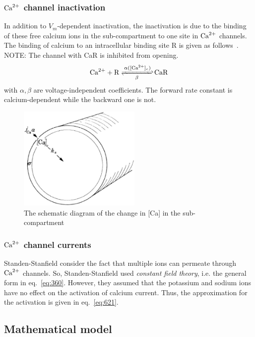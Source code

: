 \subsubsection{${\text{Ca}^{2+}}$ channel inactivation}
\label{sec:inactivation-1}

In addition to $V_m$-dependent inactivation, the inactivation is due
to the binding of these free calcium ions in the sub-compartment to one site in
${\text{Ca}^{2+}}$ channels. The binding of calcium to an intracellular binding site R is
given as follows~\citep{ashcroft1982cis}. NOTE: The channel with CaR is inhibited from
opening.
\begin{equation}
  \label{eq:382}
  \Ca +  \ce{R <=>[\alpha(\text{$[\Ca]_c$})][\beta] CaR}
\end{equation}
with $\alpha, \beta$ are voltage-independent coefficients. The forward rate
constant is calcium-dependent while the backward one is not. 

\begin{figure}[hbt]
  \centerline{\includegraphics[height=5cm,
    angle=0]{./images/SS_sigma.eps}}
  \caption{The schematic diagram of the change in [Ca] in the
    sub-compartment}
  \label{fig:sub-compartment}
\end{figure}


\subsubsection{${\text{Ca}^{2+}}$ channel currents}

Standen-Stanfield consider the fact that multiple ions can permeate through
${\text{Ca}^{2+}}$ channels. So, Standen-Stanfield used {\it constant field theory}, i.e. the
general form in eq.~\eqref{eq:360}. However, they assumed that the potassium and
sodium ions have no effect on the activation of calcium current. Thus,
the approximation for the activation is given in eq.~\eqref{eq:621}.

\subsection{Mathematical model}
\label{sec:mathematical-model-8}

